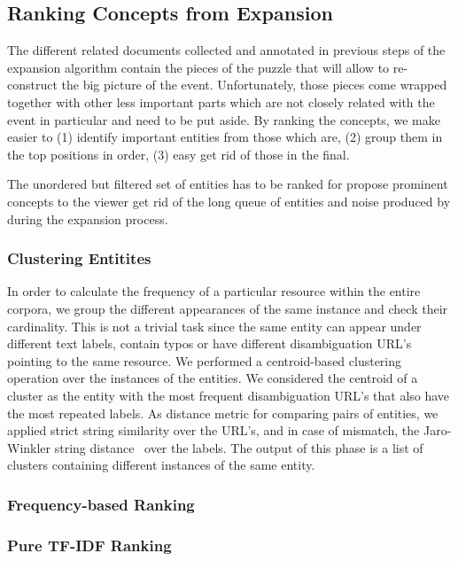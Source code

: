 \documentclass{llncs}
\begin{document}
\subsection{Ranking Concepts from Expansion}
\label{sec:Ranking}
The different related documents collected and annotated in previous steps of the expansion algorithm contain the pieces of the puzzle that will allow to re-construct the big picture of the event. Unfortunately, those pieces come wrapped together with other less important parts which are not closely related with the event in particular and need to be put aside. By ranking the concepts, we make easier to (1) identify important entities from those which are, (2) group them in the top positions in order, (3) easy get rid of those in the final.

The unordered but filtered set of entities has to be ranked for propose prominent concepts to the viewer get rid of the long queue of entities and noise produced by during the expansion process.

\subsubsection{Clustering Entitites}

In order to calculate the frequency of a particular resource within the entire corpora, we group the different appearances of the same instance and check their cardinality. This is not a trivial task since the same entity can appear under different text labels, contain typos or have different disambiguation URL's pointing to the same resource. We performed a centroid-based clustering operation over the instances of the entities. We considered the centroid of a cluster as the entity with the most frequent disambiguation URL's that also have the most repeated labels. As distance metric for comparing pairs of entities, we applied strict string similarity over the URL's, and in case of mismatch, the Jaro-Winkler string distance~\cite{winkler2006overview} over the labels. The output of this phase is a list of clusters containing different instances of the same entity.

\subsubsection{Frequency-based Ranking}

\subsubsection{Pure TF-IDF  Ranking}
\end{document}
